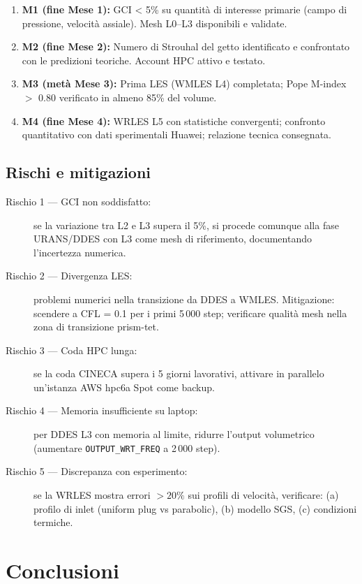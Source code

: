 \documentclass[11pt,a4paper]{article}
\newcommand{\ttcfg}[1]{\texttt{\color{codegray}#1}}
\begin{document}
\begin{enumerate}
  \item \textbf{M1 (fine Mese 1):} GCI < 5\% su quantità di interesse primarie (campo di pressione, velocità assiale). Mesh L0--L3 disponibili e validate.
  \item \textbf{M2 (fine Mese 2):} Numero di Strouhal del getto identificato e confrontato con le predizioni teoriche. Account HPC attivo e testato.
  \item \textbf{M3 (metà Mese 3):} Prima LES (WMLES L4) completata; Pope M-index $>$ 0.80 verificato in almeno 85\% del volume.
  \item \textbf{M4 (fine Mese 4):} WRLES L5 con statistiche convergenti; confronto quantitativo con dati sperimentali Huawei; relazione tecnica consegnata.
\end{enumerate}

\subsection{Rischi e mitigazioni}

\begin{description}
  \item[Rischio 1 — GCI non soddisfatto:] se la variazione tra L2 e L3 supera il 5\%, si procede comunque alla fase URANS/DDES con L3 come mesh di riferimento, documentando l'incertezza numerica.
  \item[Rischio 2 — Divergenza LES:] problemi numerici nella transizione da DDES a WMLES. Mitigazione: scendere a CFL = 0.1 per i primi 5\,000 step; verificare qualità mesh nella zona di transizione prism-tet.
  \item[Rischio 3 — Coda HPC lunga:] se la coda CINECA supera i 5 giorni lavorativi, attivare in parallelo un'istanza AWS hpc6a Spot come backup.
  \item[Rischio 4 — Memoria insufficiente su laptop:] per DDES L3 con memoria al limite, ridurre l'output volumetrico (aumentare \ttcfg{OUTPUT\_WRT\_FREQ} a 2\,000 step).
  \item[Rischio 5 — Discrepanza con esperimento:] se la WRLES mostra errori $> 20\%$ sui profili di velocità, verificare: (a) profilo di inlet (uniform plug vs parabolic), (b) modello SGS, (c) condizioni termiche.
\end{description}

\section{Conclusioni}
\label{sec:conclusioni}
\end{document}
